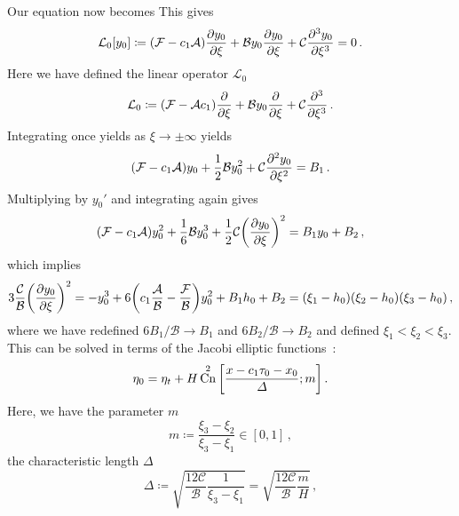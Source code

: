 \documentclass{jfm}
\DeclareMathOperator{\cn}{Cn}
\begin{document}
Our equation now becomes
This gives
\begin{equation}
  \mathcal{L}_0[y_0] \coloneqq
    \pqty{\mathcal{F} -c_1 \mathcal{A}} \pdv{y_0}{\xi} + \mathcal{B} y_0
    \pdv{y_0}{\xi} + \mathcal{C} \pdv[3]{y_0}{\xi} = 0 \,.
  \label{eq:L0_kernel}
\end{equation}
Here we have defined the linear operator $\mathcal{L}_0$
\begin{equation}
  \mathcal{L}_0 \coloneqq \pqty{\mathcal{F} - \mathcal{A} c_1} \pdv{\xi}
    + \mathcal{B} y_0 \pdv{\xi} + \mathcal{C} \pdv[3]{\xi} \,.
  \label{eq:L0_def}
\end{equation}
Integrating once yields
as $\xi \to \pm \infty$ yields
\begin{equation}
  \pqty{\mathcal{F} - c_1 \mathcal{A}} y_0 + \frac{1}{2} \mathcal{B}
    y_0^2 + \mathcal{C} \pdv[2]{y_0}{\xi} = B_1 \,.
\end{equation}
Multiplying by $y_0'$ and integrating again gives
\begin{equation}
  \pqty{\mathcal{F} - c_1 \mathcal{A}} y_0^2 + \frac{1}{6} \mathcal{B}
    y_0^3 + \frac{1}{2} \mathcal{C} \pqty{\pdv{y_0}{\xi}}^2 = B_1 y_0 +
    B_2 \,,
\end{equation}
which implies
\begin{equation}
  3 \frac{\mathcal{C}}{\mathcal{B}} \pqty{\pdv{y_0}{\xi}}^2 = - y_0^3
    + 6 \pqty{c_1 \frac{\mathcal{A}}{\mathcal{B}} -
    \frac{\mathcal{F}}{\mathcal{B}}} y_0^2 + B_1 h_0 + B_2
    = \pqty{\xi_1 - h_0} \pqty{\xi_2 - h_0} \pqty{\xi_3 - h_0} \,,
\end{equation}
where we have redefined $6 B_1/\mathcal{B} \to B_1$ and $6
B_2/\mathcal{B} \to B_2$ and defined $\xi_1 < \xi_2 < \xi_3$.
This can be solved in terms of the Jacobi elliptic
functions~\citep[\eg][]{mei2005nonlinear}:
\begin{equation}
  \eta_0 = \eta_t + H \cn^2\bqty{\frac{x - c_1 \tau_0 - x_0}{\Delta}; m} \,.
  \label{eq:cnoidal_sol_nondim}
\end{equation}
Here, we have the parameter $m$
\begin{equation}
  m \coloneqq \frac{\xi_3 - \xi_2}{\xi_3 - \xi_1} \in [0,1] \,,
\end{equation}
the characteristic length $\Delta$
\begin{equation}
  \Delta \coloneqq \sqrt{\frac{12 \mathcal{C}}{\mathcal{B}} \frac{1}{\xi_3 - \xi_1}}
  = \sqrt{\frac{12 \mathcal{C}}{\mathcal{B}} \frac{m}{H}} \,,
  \label{eq:nondim_delta_def}
\end{equation}
\end{document}
